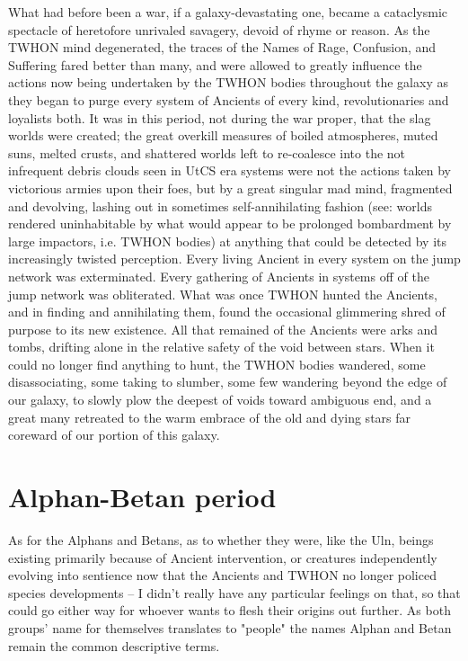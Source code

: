What had before been a war, if a galaxy-devastating one, became a
cataclysmic spectacle of heretofore unrivaled savagery, devoid of
rhyme or reason. As the TWHON mind degenerated, the traces of the
Names of Rage, Confusion, and Suffering fared better than many, and
were allowed to greatly influence the actions now being undertaken by
the TWHON bodies throughout the galaxy as they began to purge every
system of Ancients of every kind, revolutionaries and loyalists
both. It was in this period, not during the war proper, that the slag
worlds were created; the great overkill measures of boiled
atmospheres, muted suns, melted crusts, and shattered worlds left to
re-coalesce into the not infrequent debris clouds seen in UtCS era
systems were not the actions taken by victorious armies upon their
foes, but by a great singular mad mind, fragmented and devolving,
lashing out in sometimes self-annihilating fashion (see: worlds
rendered uninhabitable by what would appear to be prolonged
bombardment by large impactors, i.e. TWHON bodies) at anything that
could be detected by its increasingly twisted perception. Every living
Ancient in every system on the jump network was exterminated. Every
gathering of Ancients in systems off of the jump network was
obliterated. What was once TWHON hunted the Ancients, and in finding
and annihilating them, found the occasional glimmering shred of
purpose to its new existence. All that remained of the Ancients were
arks and tombs, drifting alone in the relative safety of the void
between stars. When it could no longer find anything to hunt, the
TWHON bodies wandered, some disassociating, some taking to slumber,
some few wandering beyond the edge of our galaxy, to slowly plow the
deepest of voids toward ambiguous end, and a great many retreated to
the warm embrace of the old and dying stars far coreward of our
portion of this galaxy.

\section{Alphan-Betan period}
As for the Alphans and Betans, as to whether they were, like the Uln,
beings existing primarily because of Ancient intervention, or
creatures independently evolving into sentience now that the Ancients
and TWHON no longer policed species developments -- I didn't really
have any particular feelings on that, so that could go either way for
whoever wants to flesh their origins out further. As
both groups' name for themselves translates to "people" the names
Alphan and Betan remain the common descriptive terms.

